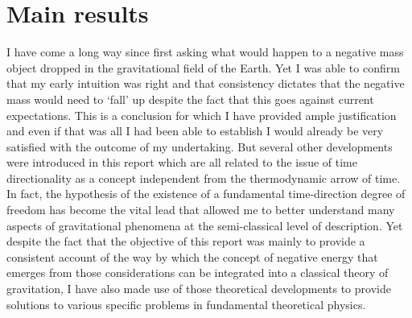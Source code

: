 \documentclass[notitlepage,12pt]{report}
\begin{document}
\section{Main results}

I have come a long way since first asking what would happen to a negative mass object dropped in the gravitational field of the Earth. Yet I was able to confirm that my early intuition was right and that consistency dictates that the negative mass would need to `fall' up despite the fact that this goes against current expectations. This is a conclusion for which I have provided ample justification and even if that was all I had been able to establish I would already be very satisfied with the outcome of my undertaking. But several other developments were introduced in this report which are all related to the issue of time directionality as a concept independent from the thermodynamic arrow of time. In fact, the hypothesis of the existence of a fundamental time-direction degree of freedom has become the vital lead that allowed me to better understand many aspects of gravitational phenomena at the semi-classical level of description. Yet despite the fact that the objective of this report was mainly to provide a consistent account of the way by which the concept of negative energy that emerges from those considerations can be integrated into a classical theory of gravitation, I have also made use of those theoretical developments to provide solutions to various specific problems in fundamental theoretical physics.
\end{document}
